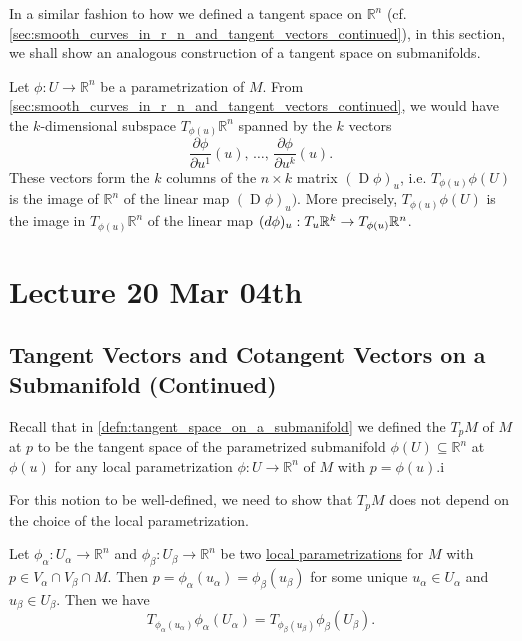 \documentclass[notoc,notitlepage]{tufte-book}
\DeclareMathOperator{\D}{D}
\begin{document}
In a similar fashion to how we defined a tangent space on $\mathbb{R}^n$ (cf.
\cref{sec:smooth_curves_in_r_n_and_tangent_vectors_continued}), in
this section, we shall show an analogous construction of a tangent space on
submanifolds.

Let $\phi : U \to \mathbb{R}^n$ be a parametrization of $M$. From
\cref{sec:smooth_curves_in_r_n_and_tangent_vectors_continued}, we would have the
$k$-dimensional subspace $T_{\phi(u)} \mathbb{R}^n$ spanned by the $k$ vectors
\begin{equation*}
  \frac{\partial \phi}{\partial u^1} (u), \, \hdots, \, \frac{\partial
  \phi}{\partial u^k} (u).
\end{equation*}
These vectors form the $k$ columns of the $n \times k$ matrix $(\D \phi)_u$,
i.e. $T_{\phi(u)} \phi(U)$ is the image of $\mathbb{R}^n$ of the linear map $(\D
\phi)_u)$. More precisely, $T_{\phi(u)} \phi(U)$ is the image in $T_{\phi(u)}
\mathbb{R}^n$ of the linear map $(\mathop{}\!d{\phi})_u : T_u \mathbb{R}^k \to
T_{\phi(u)} \mathbb{R}^n$.



\chapter{Lecture 20 Mar 04th}%
\label{chp:lecture_20_mar_04th}

\section{Tangent Vectors and Cotangent Vectors on a Submanifold (Continued)}%
\label{sec:tangent_vectors_and_cotangent_vectors_on_a_submanifold_continued}

Recall that in \cref{defn:tangent_space_on_a_submanifold} we defined the
 $T_p M$ of $M$ at $p$ to be the tangent space of the
parametrized submanifold $\phi(U) \subseteq \mathbb{R}^n$ at $\phi(u)$ for any
local parametrization $\phi : U \to \mathbb{R}^n$ of $M$ with $p = \phi(u)$.i

For this notion to be well-defined, we need to show that $T_p M$ does not depend
on the choice of the local parametrization.

\begin{propo}\label{propo:well_definedness_of_the_tangent_space_of_a_submanifold}
  Let $\phi_\alpha : U_\alpha \to \mathbb{R}^n$ and $\phi_\beta : U_\beta \to
  \mathbb{R}^n$ be two \hyperref[defn:local_parametrizations]{local
  parametrizations} for $M$ with $p \in V_\alpha \cap V_\beta \cap M$. Then $p =
  \phi_\alpha (u_\alpha) = \phi_\beta(u_\beta)$ for some unique $u_\alpha \in
  U_\alpha$ and $u_\beta \in U_\beta$. Then we have
  \begin{equation*}
    T_{\phi_{\alpha} (u_\alpha) } \phi_\alpha (U_\alpha) = T_{\phi_\beta(u_\beta)}
    \phi_\beta (U_\beta).
  \end{equation*}
\end{propo}
\end{document}
